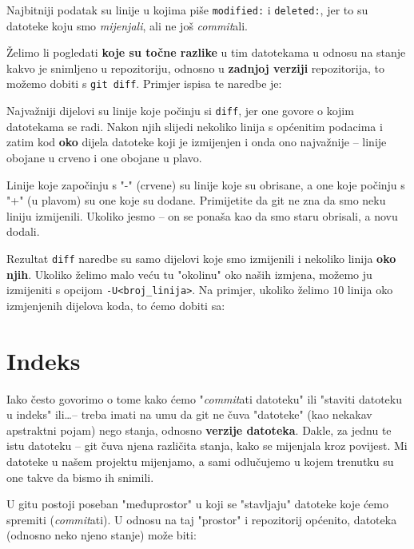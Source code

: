 

Najbitniji podatak su linije u kojima piše \verb+modified:+ i \verb+deleted:+, jer to su datoteke koju smo \emph{mijenjali}, ali ne još \emph{commit}ali.

Želimo li pogledati \textbf{koje su točne razlike} u tim datotekama u odnosu na stanje kakvo je snimljeno u repozitoriju, odnosno u \textbf{zadnjoj verziji} repozitorija, to možemo dobiti s \verb+git diff+. 
Primjer ispisa te naredbe je:



Najvažniji dijelovi su linije koje počinju si \verb+diff+, jer one govore o kojim datotekama se radi.
Nakon njih slijedi nekoliko linija s općenitim podacima i zatim kod \textbf{oko} dijela datoteke koji je izmijenjen i onda ono najvažnije -- linije obojane u crveno i one obojane u plavo.

Linije koje započinju s "-" (crvene) su linije koje su obrisane, a one koje počinju s "+" (u plavom) su one koje su dodane. 
Primijetite da git ne zna da smo neku liniju izmijenili. 
Ukoliko jesmo -- on se ponaša kao da smo staru obrisali, a novu dodali.

Rezultat \verb+diff+ naredbe su samo dijelovi koje smo izmijenili i nekoliko linija \textbf{oko njih}.
Ukoliko želimo malo veću tu "okolinu" oko naših izmjena, možemo ju izmijeniti s opcijom \verb+-U<broj_linija>+.
Na primjer, ukoliko želimo $10$ linija oko izmjenjenih dijelova koda, to ćemo dobiti sa:


\section*{Indeks}

Iako često govorimo o tome kako ćemo "\emph{commit}ati datoteku" ili "staviti datoteku u indeks" ili\dots -- treba imati na umu da git ne čuva "datoteke" (kao nekakav apstraktni pojam) nego stanja, odnosno \textbf{verzije datoteka}.
Dakle, za jednu te istu datoteku -- git čuva njena različita stanja, kako se mijenjala kroz povijest.
Mi datoteke u našem projektu mijenjamo, a sami odlučujemo u kojem trenutku su one takve da bismo ih snimili.

U gitu postoji poseban "međuprostor" u koji se "stavljaju" datoteke koje ćemo spremiti (\emph{commit}ati).
U odnosu na taj "prostor" i repozitorij općenito, datoteka (odnosno neko njeno stanje) može biti:

